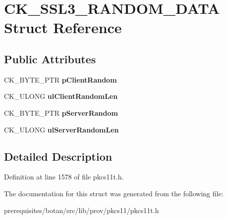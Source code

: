 \hypertarget{struct_c_k___s_s_l3___r_a_n_d_o_m___d_a_t_a}{}\section{C\+K\+\_\+\+S\+S\+L3\+\_\+\+R\+A\+N\+D\+O\+M\+\_\+\+D\+A\+TA Struct Reference}
\label{struct_c_k___s_s_l3___r_a_n_d_o_m___d_a_t_a}
\subsection*{Public Attributes}
\begin{DoxyCompactItemize}
\item 
\mbox{\label{struct_c_k___s_s_l3___r_a_n_d_o_m___d_a_t_a_a755ea91cff2ee6fec1e18ca9c3cef73a}} 
C\+K\+\_\+\+B\+Y\+T\+E\+\_\+\+P\+TR {\bfseries p\+Client\+Random}
\item 
\mbox{\label{struct_c_k___s_s_l3___r_a_n_d_o_m___d_a_t_a_a7600adeb062aab5564a696a245a52d5a}} 
C\+K\+\_\+\+U\+L\+O\+NG {\bfseries ul\+Client\+Random\+Len}
\item 
\mbox{\label{struct_c_k___s_s_l3___r_a_n_d_o_m___d_a_t_a_ae4a4d7d0c9586d996db0d37269ade3ad}} 
C\+K\+\_\+\+B\+Y\+T\+E\+\_\+\+P\+TR {\bfseries p\+Server\+Random}
\item 
\mbox{\label{struct_c_k___s_s_l3___r_a_n_d_o_m___d_a_t_a_a2a275093e7bbe9297b76ed08a7056ceb}} 
C\+K\+\_\+\+U\+L\+O\+NG {\bfseries ul\+Server\+Random\+Len}
\end{DoxyCompactItemize}


\subsection{Detailed Description}


Definition at line 1578 of file pkcs11t.\+h.



The documentation for this struct was generated from the following file\+:\begin{DoxyCompactItemize}
\item 
prerequisites/botan/src/lib/prov/pkcs11/pkcs11t.\+h\end{DoxyCompactItemize}
